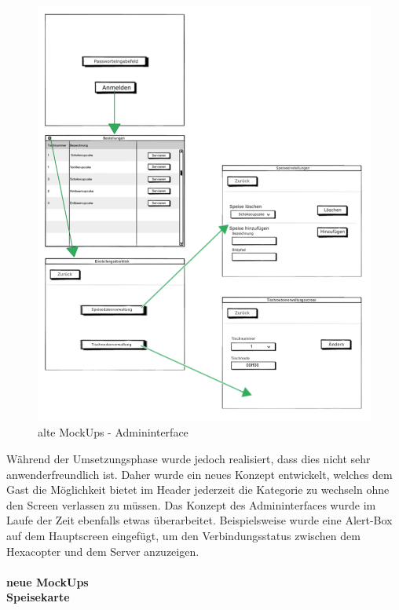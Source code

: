 			\begin{figure}[H]
			\begin{centering}
			\includegraphics[width = 1\textwidth]{Bilder/Jok_alte_mockups_admin}
			\par\end{centering}
			\caption{alte MockUps - Admininterface}
			\label{alte MockUps}
			\end{figure}Während der Umsetzungsphase wurde jedoch realisiert, dass dies nicht sehr anwenderfreundlich ist. Daher wurde ein neues Konzept entwickelt, welches dem Gast die Möglichkeit bietet im Header jederzeit die Kategorie zu wechseln ohne den Screen verlassen zu müssen. Das Konzept des Admininterfaces wurde im Laufe der Zeit ebenfalls etwas überarbeitet. Beispielsweise wurde eine Alert-Box auf dem Hauptscreen eingefügt, um den Verbindungsstatus zwischen dem Hexacopter und dem Server anzuzeigen.
\\ \\
\textbf{neue MockUps}\\
\textbf{Speisekarte}\\
